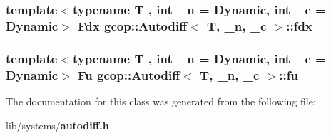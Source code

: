 \subsubsection[{fdx}]{\setlength{\rightskip}{0pt plus 5cm}template$<$typename T , int \-\_\-n = \-Dynamic, int \-\_\-c = \-Dynamic$>$ {\bf \-Fdx} {\bf gcop\-::\-Autodiff}$<$ \-T, \-\_\-n, \-\_\-c $>$\-::{\bf fdx}}\label{classgcop_1_1Autodiff_a4dd9f4121dfda23a1de966fc7d7f120b}
\subsubsection[{fu}]{\setlength{\rightskip}{0pt plus 5cm}template$<$typename T , int \-\_\-n = \-Dynamic, int \-\_\-c = \-Dynamic$>$ {\bf \-Fu} {\bf gcop\-::\-Autodiff}$<$ \-T, \-\_\-n, \-\_\-c $>$\-::{\bf fu}}\label{classgcop_1_1Autodiff_a4bb72109695d62075b21b9f8f317c6c7}


\-The documentation for this class was generated from the following file\-:\begin{DoxyCompactItemize}
\item 
lib/systems/{\bf autodiff.\-h}\end{DoxyCompactItemize}
